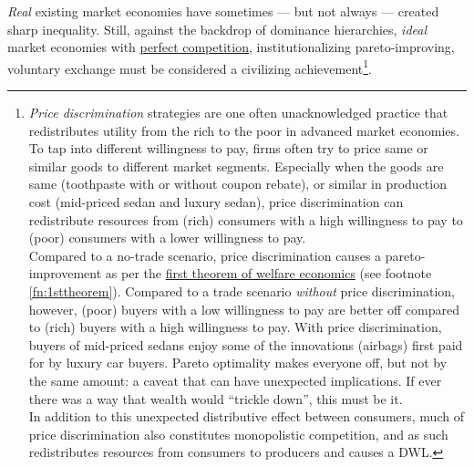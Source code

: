 \emph{Real} existing market economies have sometimes --- but not always --- created sharp inequality. Still, against the backdrop of dominance hierarchies, \emph{ideal} market economies with \hyperref[fn:perfectcompetition]{perfect competition}, institutionalizing pareto-improving, voluntary exchange must be considered a civilizing achievement\footnote{
	\emph{Price discrimination} strategies are one often unacknowledged practice that redistributes utility from the rich to the poor in advanced market economies. To tap into different willingness to pay, firms often try to price same or similar goods to different market segments. Especially when the goods are same (toothpaste with or without coupon rebate), or similar in production cost (mid-priced sedan and luxury sedan), price discrimination can redistribute resources from (rich) consumers with a high willingness to pay to (poor) consumers with a lower willingness to pay.\\
	Compared to a no-trade scenario, price discrimination causes a pareto-improvement as per the \hyperref[fn:1sttheorem]{first theorem of welfare economics} (see footnote \ref{fn:1sttheorem}). Compared to a trade scenario \emph{without} price discrimination, however, (poor) buyers with a low willingness to pay are better off compared to (rich) buyers with a high willingness to pay. With price discrimination, buyers of mid-priced sedans enjoy some of the innovations (airbags) first paid for by luxury car buyers. Pareto optimality makes everyone off, but not by the same amount: a caveat that can have unexpected implications. If ever there was a way that wealth would ``trickle down'', this must be it.\\
	In addition to this unexpected distributive effect between consumers, much of price discrimination also constitutes monopolistic competition, and as such redistributes resources from consumers to producers and causes a \gls{DWL}.}.%


